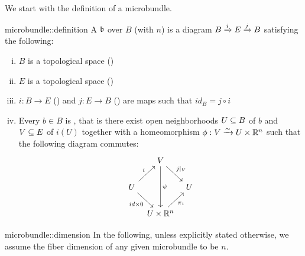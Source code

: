\begin{myparagraph}
    We start with the definition of a microbundle.
\end{myparagraph}

\begin{mydefinition}[microbundle]{microbundle::definition}
    A  $\bb$ over $B$ (with  $n$) is a diagram $\bundle{B}{E}{i}{j}$ satisfying the following:
    \begin{enumerate}[(i)]
        \item $B$ is a topological space ()
        \item $E$ is a topological space ()
        \item $i: B \to E$ () and $j: E \to B$ () are maps such that $id_B = j \circ i$
        \item Every $b \in B$ is ,
        that is there exist open neighborhoods $U \sub B$ of $b$ and $V \sub E$ of $i(U)$
        together with a homeomorphism $\phi: V \isomto U \times \R^n$ such that the following diagram commutes:
        \[
            \begin{tikzcd}[column sep=tiny]
                & V \ar[dr, "j\vert_V"] \ar[dd, "\psi"] & \\
                U \ar[ur, "i"] \ar[dr, "{id \times 0}"'] & & U \\
                & U \times\R^n \ar[ur, "\pi_1"'] &
            \end{tikzcd}
        \]
    \end{enumerate}
\end{mydefinition}

\begin{myremark}{microbundle::dimension}
    In the following, unless explicitly stated otherwise, we assume the fiber dimension of any given microbundle to be $n$.
\end{myremark}